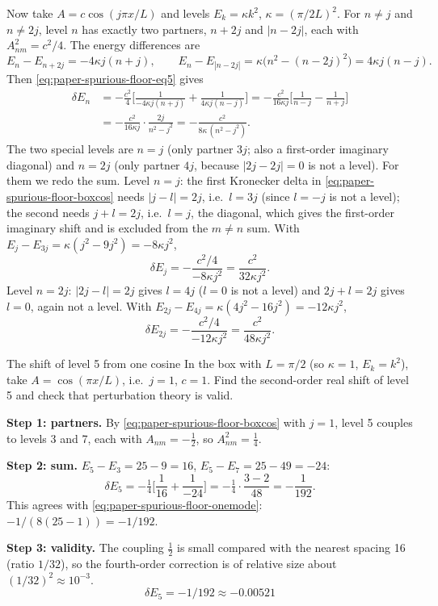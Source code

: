 Now take $A=c\cos(j\pi x/L)$ and levels $E_k=\kappa k^2$, $\kappa=(\pi/2L)^2$. For $n\neq j$ and $n\neq2j$, level $n$ has exactly two partners, $n+2j$ and $|n-2j|$, each with $A_{nm}^2=c^2/4$. The energy differences are
\[
E_n-E_{n+2j}=-4\kappa j(n+j),\qquad E_n-E_{|n-2j|}=\kappa\big(n^2-(n-2j)^2\big)=4\kappa j(n-j).
\]
Then \cref{eq:paper-spurious-floor-eq5} gives
\begin{align}
\delta E_n&=-\frac{c^2}{4}\Big[\frac{1}{-4\kappa j(n+j)}+\frac{1}{4\kappa j(n-j)}\Big]
=-\frac{c^2}{16\kappa j}\Big[\frac{1}{n-j}-\frac{1}{n+j}\Big]\nonumber\\
&=-\frac{c^2}{16\kappa j}\cdot\frac{2j}{n^2-j^2}
=-\frac{c^2}{8\kappa\,(n^2-j^2)} .\label{eq:paper-spurious-floor-onemode}
\end{align}
The two special levels are $n=j$ (only partner $3j$; also a first-order imaginary diagonal) and $n=2j$ (only partner $4j$, because $|2j-2j|=0$ is not a level). For them we redo the sum. Level $n=j$: the first Kronecker delta in \cref{eq:paper-spurious-floor-boxcos} needs $|j-l|=2j$, i.e.\ $l=3j$ (since $l=-j$ is not a level); the second needs $j+l=2j$, i.e.\ $l=j$, the diagonal, which gives the first-order imaginary shift and is excluded from the $m\ne n$ sum. With $E_j-E_{3j}=\kappa(j^2-9j^2)=-8\kappa j^2$,
\[
\delta E_j=-\frac{c^2/4}{-8\kappa j^2}=\frac{c^2}{32\kappa j^2}.
\]
Level $n=2j$: $|2j-l|=2j$ gives $l=4j$ ($l=0$ is not a level) and $2j+l=2j$ gives $l=0$, again not a level. With $E_{2j}-E_{4j}=\kappa(4j^2-16j^2)=-12\kappa j^2$,
\[
\delta E_{2j}=-\frac{c^2/4}{-12\kappa j^2}=\frac{c^2}{48\kappa j^2}.
\]

\begin{sample}{The shift of level 5 from one cosine}
In the box with $L=\pi/2$ (so $\kappa=1$, $E_k=k^2$), take $A=\cos(\pi x/L)$, i.e.\ $j=1$, $c=1$. Find the second-order real shift of level 5 and check that perturbation theory is valid.

\textbf{Step 1: partners.} By \cref{eq:paper-spurious-floor-boxcos} with $j=1$, level 5 couples to levels 3 and 7, each with $A_{nm}=-\tfrac12$, so $A_{nm}^2=\tfrac14$.

\textbf{Step 2: sum.} $E_5-E_3=25-9=16$, $E_5-E_7=25-49=-24$:
\[
\delta E_5=-\tfrac14\Big[\frac{1}{16}+\frac{1}{-24}\Big]=-\tfrac14\cdot\frac{3-2}{48}=-\frac{1}{192}.
\]
This agrees with \cref{eq:paper-spurious-floor-onemode}: $-1/(8(25-1))=-1/192$.

\textbf{Step 3: validity.} The coupling $\tfrac12$ is small compared with the nearest spacing 16 (ratio $1/32$), so the fourth-order correction is of relative size about $(1/32)^2\approx10^{-3}$.
\[
\boxed{\delta E_5=-1/192\approx-0.00521}
\]
\end{sample}

